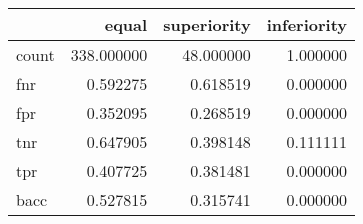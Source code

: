 \begin{tabular}{lrrr}
\toprule
{} &       equal &  superiority &  inferiority \\
\midrule
count &  338.000000 &    48.000000 &     1.000000 \\
fnr   &    0.592275 &     0.618519 &     0.000000 \\
fpr   &    0.352095 &     0.268519 &     0.000000 \\
tnr   &    0.647905 &     0.398148 &     0.111111 \\
tpr   &    0.407725 &     0.381481 &     0.000000 \\
bacc  &    0.527815 &     0.315741 &     0.000000 \\
\bottomrule
\end{tabular}
